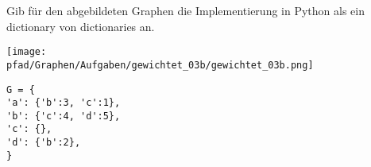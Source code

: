 ﻿\question[4]
Gib für den abgebildeten Graphen die Implementierung in Python als
ein dictionary von dictionaries an.

\texttt{[image: \\pfad/Graphen/Aufgaben/gewichtet\_03b/gewichtet\_03b.png]}
\begin{solutionbox}{5cm}
\begin{lstlisting}
G = {
'a': {'b':3, 'c':1},
'b': {'c':4, 'd':5},
'c': {},
'd': {'b':2},
}
\end{lstlisting}
\end{solutionbox}
